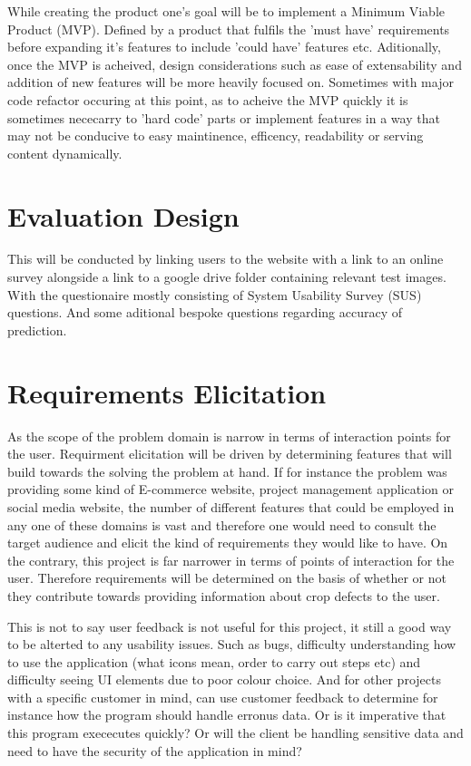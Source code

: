 While creating the product one's goal will be to implement a Minimum Viable Product (MVP). Defined by a product that fulfils the 'must have' requirements before expanding it's features to include 'could have' features etc. Aditionally, once the MVP is acheived, design considerations such as ease of extensability and addition of new features will be more heavily focused on. Sometimes with major code refactor occuring at this point, as to acheive the MVP quickly it is sometimes nececarry to 'hard code' parts or implement features in a way that may not be conducive to easy maintinence, efficency, readability or serving content dynamically.

\section{Evaluation Design}
  This will be conducted by linking users to the website with a link to an online survey alongside a link to a google drive folder containing relevant test images. With the questionaire mostly consisting of System Usability Survey (SUS) questions. And some aditional bespoke questions regarding accuracy of prediction.
\section{Requirements Elicitation}
  As the scope of the problem domain is narrow in terms of interaction points for the user. Requirment elicitation will be driven by determining features that will build towards the solving the problem at hand. If for instance the problem was providing some kind of E-commerce website, project management application or social media website, the number of different features that could be employed in any one of these domains is vast and therefore one would need to consult the target audience and elicit the kind of requirements they would like to have. On the contrary, this project is far narrower in terms of points of interaction for the user. Therefore requirements will be determined on the basis of whether or not they contribute towards providing information about crop defects to the user.
  \par
  This is not to say user feedback is not useful for this project, it still a good way to be alterted to any usability issues. Such as bugs, difficulty understanding how to use the application (what icons mean, order to carry out steps etc) and difficulty seeing UI elements due to poor colour choice. And for other projects with a specific customer in mind, can use customer feedback to determine for instance how the program should handle erronus data. Or is it imperative that this program exececutes quickly? Or will the client be handling sensitive data and need to have the security of the application in mind?

